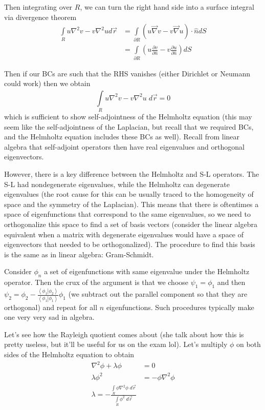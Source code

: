 \documentclass[10pt]{report}
\newcommand{\dotp}[2]{\left<#1\left.\right|#2\right>}
\newcommand{\pd}[2]{\frac{\partial #1}{\partial#2}}
\begin{document}
Then integrating over $R$, we can turn the right hand side into a surface integral via divergence theorem
\begin{align}
    \int\limits_{R}^{}u \nabla^2 v - v\nabla^2 u d\vec{r}&= \int\limits_{\partial R}^{}\left( u \vec{\nabla} v - v \vec{\nabla}u \right) \cdot \hat{n} dS\\
    &= \int\limits_{\partial R}^{}\left( u \pd{v}{\hat{n}} - v\pd{u}{\hat{n}} \right)dS
\end{align}

Then if our BCs are such that the RHS vanishes (either Dirichlet or Neumann could work) then we obtain
\begin{equation}
    \int\limits_{R}^{}u \nabla^2 v - v\nabla^2 u\;d\vec{r} = 0
\end{equation}
which is sufficient to show self-adjointness of the Helmholtz equation (this may seem like the self-adjointness of the Laplacian, but recall that we required BCs, and the Helmholtz equation includes these BCs as well). Recall from linear algebra that self-adjoint operators then have real eigenvalues and orthogonal eigenvectors. 

However, there is a key difference between the Helmholtz and S-L operators. The S-L had nondegenerate eigenvalues, while the Helmholtz can degenerate eigenvalues (the root cause for this can be usually traced to the homogeneity of space and the symmetry of the Laplacian). This means that there is oftentimes a space of eigenfunctions that correspond to the same eigenvalues, so we need to orthogonalize this space to find a set of basis vectors (consider the linear algebra equivalent when a matrix with degenerate eigenvalues would have a space of eigenvectors that needed to be orthogonalized). The procedure to find this basis is the same as in linear algebra: Gram-Schmidt.

Consider $\phi_n$ a set of eigenfunctions with same eigenvalue under the Helmholtz operator. Then the crux of the argument is that we choose $\psi_1 = \phi_1$ and then $\psi_2 = \phi_2 - \frac{\dotp{\phi_1}{\phi_2}}{\dotp{\phi_1}{\phi_1}}\phi_1$ (we subtract out the parallel component so that they are orthogonal) and repeat for all $n$ eigenfunctions. Such procedures typically make one very very sad in algebra.

Let's see how the Rayleigh quotient comes about (she talk about how this is pretty useless, but it'll be useful for us on the exam lol). Let's multiply $\phi$ on both sides of the Helmholtz equation to obtain
\begin{align}
    \nabla^2 \phi + \lambda \phi &= 0\\
    \lambda \phi^2 &= -\phi \nabla^2 \phi\\
    \lambda = -\frac{\int\limits_{R}^{}\phi \nabla^2 \phi\;d\vec{r}}{\int\limits_{R}^{}\phi^2\;d\vec{r}}
\end{align}
\end{document}
